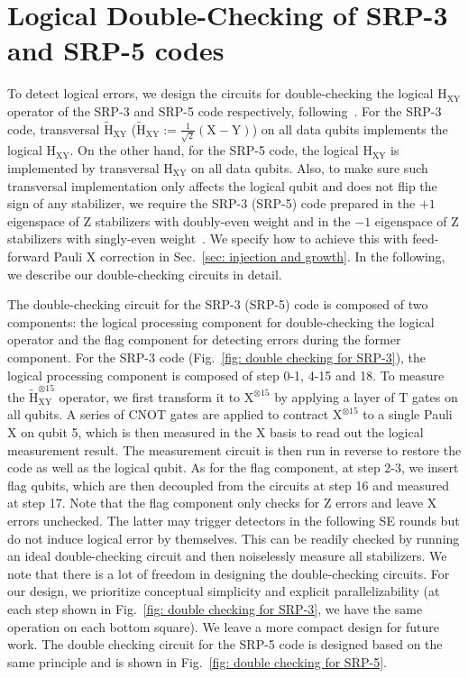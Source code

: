 \documentclass[reprint,aps,twocolumn,superscriptaddress,showpacs,notitlepage,10pt]{revtex4-2}
\theoremstyle{definition}
\begin{document}
\section{Logical Double-Checking of SRP-3 and SRP-5 codes}\label{sec: logical double checking}


To detect logical errors, we design the circuits for double-checking the logical $\mathrm{H}_{\mathrm{XY}}$ operator of the SRP-3 and SRP-5 code respectively,  
following~\cite{gidney_magic_2024}. For the SRP-3 code, transversal $\tilde{\mathrm{H}}_{\mathrm{XY}}$ ($\tilde{\mathrm{H}}_{\mathrm{XY}}:=\frac{1}{\sqrt{2}}(\mathrm{X}-\mathrm{Y})$) on all data qubits implements the logical $\mathrm{H}_{\mathrm{XY}}$. On the other hand, for the SRP-5 code, the logical $\mathrm{H}_{\mathrm{XY}}$ is implemented by transversal $\mathrm{H}_{\mathrm{XY}}$ on all data qubits. Also, to make sure such transversal implementation only affects the logical qubit and does not flip the sign of any stabilizer, we require the SRP-3 (SRP-5) code prepared in the $+1$ eigenspace of Z stabilizers with doubly-even weight and in the $-1$ eigenspace of Z stabilizers with singly-even weight~\cite{gidney_magic_2024}. We specify how to achieve this with feed-forward Pauli X correction in Sec.~\ref{sec: injection and growth}. In the following, we describe our double-checking circuits in detail. 

The double-checking circuit for the SRP-3 (SRP-5) code is composed of two components: the logical processing component for double-checking the logical operator and the flag component for detecting errors during the former component. For the SRP-3 code (Fig.~\ref{fig: double checking for SRP-3}), the logical processing component is composed of step 0-1, 4-15 and 18. To measure the $\tilde{\mathrm{H}}_{\mathrm{XY}}^{\otimes 15}$ operator, we first transform it to $\mathrm{X}^{\otimes 15}$ by applying a layer of $\mathrm{T}$ gates on all qubits. A series of CNOT gates are applied to contract $\mathrm{X}^{\otimes 15}$ to a single Pauli $\mathrm{X}$ on qubit 5, which is then measured in the $\mathrm{X}$ basis to read out the logical measurement result. The measurement circuit is then run in reverse to restore the code as well as the logical qubit. As for the flag component, at step 2-3, we insert flag qubits, which are then decoupled from the circuits at step 16 and measured at step 17. Note that the flag component only checks for Z errors and leave X errors unchecked. The latter may trigger detectors in the following SE rounds but do not induce logical error by themselves. This can be readily checked by running an ideal double-checking circuit and then noiselessly measure all stabilizers. We note that there is a lot of freedom in designing the double-checking circuits. For our design, we prioritize conceptual simplicity and explicit parallelizability (at each step shown in Fig.~\ref{fig: double checking for SRP-3}, we have the same operation on each bottom square). We leave a more compact design for future work. The double checking circuit for the SRP-5 code is designed based on the same principle and is shown in Fig.~\ref{fig: double checking for SRP-5}.    
\end{document}
